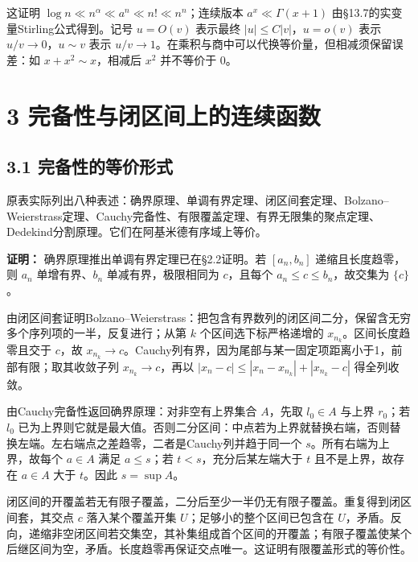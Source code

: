 \documentclass[11pt,a4paper]{article}
\begin{document}
这证明 \(\log n\ll n^\alpha\ll a^n\ll n!\ll n^n\)；连续版本
\(a^x\ll\Gamma(x+1)\) 由§13.7的实变量Stirling公式得到。记号 \(u=O(v)\)
表示最终 \(|u|\le C|v|\)，\(u=o(v)\) 表示 \(u/v\to0\)，\(u\sim v\) 表示
\(u/v\to1\)。在乘积与商中可以代换等价量，但相减须保留误差：如
\(x+x^2\sim x\)，相减后 \(x^2\) 并不等价于 \(0\)。

\clearpage

\section{3
完备性与闭区间上的连续函数}\label{ux5b8cux5907ux6027ux4e0eux95edux533aux95f4ux4e0aux7684ux8fdeux7eedux51fdux6570}

\subsection{3.1
完备性的等价形式}\label{ux5b8cux5907ux6027ux7684ux7b49ux4ef7ux5f62ux5f0f}

原表实际列出八种表述：确界原理、单调有界定理、闭区间套定理、Bolzano--Weierstrass定理、Cauchy完备性、有限覆盖定理、有界无限集的聚点定理、Dedekind分割原理。它们在阿基米德有序域上等价。

\textbf{证明：} 确界原理推出单调有界定理已在§2.2证明。若 \([a_n,b_n]\)
递缩且长度趋零，则 \(a_n\) 单增有界、\(b_n\) 单减有界，极限相同为
\(c\)，且每个 \(a_n\le c\le b_n\)，故交集为 \(\{c\}\)。

由闭区间套证明Bolzano--Weierstrass：把包含有界数列的闭区间二分，保留含无穷多个序列项的一半，反复进行；从第
\(k\) 个区间选下标严格递增的 \(x_{n_k}\)。区间长度趋零且交于 \(c\)，故
\(x_{n_k}\to c\)。Cauchy列有界，因为尾部与某一固定项距离小于1，前部有限；取其收敛子列
\(x_{n_k}\to c\)，再以 \(|x_n-c|\le|x_n-x_{n_k}|+|x_{n_k}-c|\)
得全列收敛。

由Cauchy完备性返回确界原理：对非空有上界集合 \(A\)，先取 \(l_0\in A\)
与上界 \(r_0\)；若 \(l_0\)
已为上界则它就是最大值。否则二分区间：中点若为上界就替换右端，否则替换左端。左右端点之差趋零，二者是Cauchy列并趋于同一个
\(s\)。所有右端为上界，故每个 \(a\in A\) 满足 \(a\le s\)；若
\(t<s\)，充分后某左端大于 \(t\) 且不是上界，故存在 \(a\in A\) 大于
\(t\)。因此 \(s=\sup A\)。

闭区间的开覆盖若无有限子覆盖，二分后至少一半仍无有限子覆盖。重复得到闭区间套，其交点
\(c\) 落入某个覆盖开集 \(U\)；足够小的整个区间已包含在
\(U\)，矛盾。反向，递缩非空闭区间若交集空，其补集组成首个区间的开覆盖；有限子覆盖使某个后继区间为空，矛盾。长度趋零再保证交点唯一。这证明有限覆盖形式的等价性。
\end{document}
